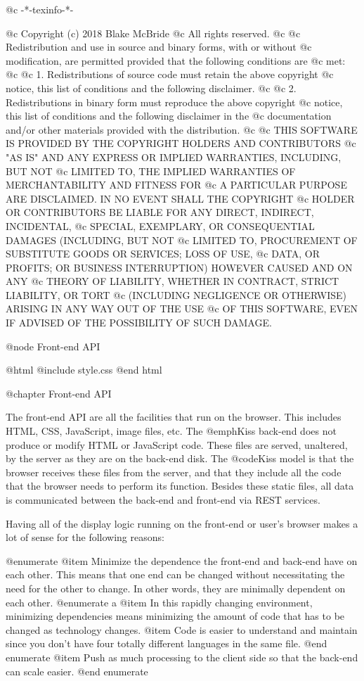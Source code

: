 @c -*-texinfo-*-

@c  Copyright (c) 2018 Blake McBride
@c  All rights reserved.
@c
@c  Redistribution and use in source and binary forms, with or without
@c  modification, are permitted provided that the following conditions are
@c  met:
@c
@c  1. Redistributions of source code must retain the above copyright
@c  notice, this list of conditions and the following disclaimer.
@c
@c  2. Redistributions in binary form must reproduce the above copyright
@c  notice, this list of conditions and the following disclaimer in the
@c  documentation and/or other materials provided with the distribution.
@c
@c  THIS SOFTWARE IS PROVIDED BY THE COPYRIGHT HOLDERS AND CONTRIBUTORS
@c  "AS IS" AND ANY EXPRESS OR IMPLIED WARRANTIES, INCLUDING, BUT NOT
@c  LIMITED TO, THE IMPLIED WARRANTIES OF MERCHANTABILITY AND FITNESS FOR
@c  A PARTICULAR PURPOSE ARE DISCLAIMED. IN NO EVENT SHALL THE COPYRIGHT
@c  HOLDER OR CONTRIBUTORS BE LIABLE FOR ANY DIRECT, INDIRECT, INCIDENTAL,
@c  SPECIAL, EXEMPLARY, OR CONSEQUENTIAL DAMAGES (INCLUDING, BUT NOT
@c  LIMITED TO, PROCUREMENT OF SUBSTITUTE GOODS OR SERVICES; LOSS OF USE,
@c  DATA, OR PROFITS; OR BUSINESS INTERRUPTION) HOWEVER CAUSED AND ON ANY
@c  THEORY OF LIABILITY, WHETHER IN CONTRACT, STRICT LIABILITY, OR TORT
@c  (INCLUDING NEGLIGENCE OR OTHERWISE) ARISING IN ANY WAY OUT OF THE USE
@c  OF THIS SOFTWARE, EVEN IF ADVISED OF THE POSSIBILITY OF SUCH DAMAGE.

@node Front-end API

@html
@include style.css
@end html

@chapter Front-end API

The front-end API are all the facilities that run on the browser.
This includes HTML, CSS, JavaScript, image files, etc.  The @emph{Kiss}
back-end does not produce or modify HTML or JavaScript code.  These
files are served, unaltered, by the server as they are on the back-end
disk.  The @code{Kiss} model is that the browser receives these files
from the server, and that they include all the code that the browser
needs to perform its function.  Besides these static files, all data
is communicated between the back-end and front-end via REST services.

Having all of the display logic running on the front-end or user's
browser makes a lot of sense for the following reasons:

@enumerate
@item
Minimize the dependence the front-end and back-end have on each other.  This means that one end can be changed without necessitating
the need for the other to change.  In other words, they are minimally dependent on each other.
@enumerate a
@item
In this rapidly changing environment, minimizing dependencies means minimizing the amount of code that has to be changed as technology changes.
@item
Code is easier to understand and maintain since you don't have four totally different languages in the same file.
@end enumerate
@item
Push as much processing to the client side so that the back-end can scale easier.
@end enumerate

